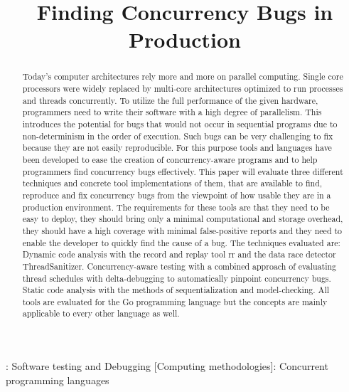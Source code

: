 \documentclass[conference]{IEEEtran}
\begin{document}
\title{Finding Concurrency Bugs in Production}

\author{
}

\maketitle

\begin{abstract}
Today's computer architectures rely more and more on parallel computing.
Single core processors were widely replaced by multi-core architectures optimized to run processes and threads concurrently.
To utilize the full performance of the given hardware, programmers need to write their software with a high degree of parallelism.
This introduces the potential for bugs that would not occur in sequential programs due to non-determinism in the order of execution.
Such bugs can be very challenging to fix because they are not easily reproducible.
For this purpose tools and languages have been developed to ease the creation of concurrency-aware programs and to help programmers find concurrency bugs effectively.
This paper will evaluate three different techniques and concrete tool implementations of them, that are available to find, reproduce and fix concurrency bugs from the viewpoint of how usable they are in a production environment.
The requirements for these tools are that they need to be easy to deploy, they should bring only a minimal computational and storage overhead, they should have a high coverage with minimal false-positive reports and they need to enable the developer to quickly find the cause of a bug.
The techniques evaluated are: Dynamic code analysis with the record and replay tool rr and the data race detector ThreadSanitizer.
Concurrency-aware testing with a combined approach of evaluating thread schedules with delta-debugging to automatically pinpoint concurrency bugs.
Static code analysis with the methods of sequentialization and model-checking.
All tools are evaluated for the Go programming language but the concepts are mainly applicable to every other language as well.
\end{abstract}

\begin{IEEEkeywords}
    : Software testing and Debugging
    [Computing methodologies]: Concurrent programming languages
\end{IEEEkeywords}
\end{document}
